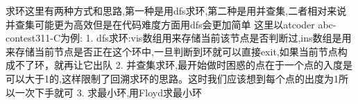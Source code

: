 求环这里有两种方式和思路,第一种是用dfs求环,第二种是用并查集,二者相对来说并查集可能更为高效但是在代码难度方面用dfs会更加简单
这里以atcoder abc-contest311-C为例:
1. dfs求环:vis数组用来存储当前该节点是否判断过,ins数组是用来存储当前节点是否正在这个环中,一旦判断到环就可以直接exit,如果当前节点构成不了环，就再让它出队
2. 并查集求环,最开始做时困惑的点在于一个点的入度是可以大于1的,这样限制了回溯求环的思路。这时我们应该想到每个点的出度为1所以一次下手就可
3. 求最小环,用Floyd求最小环